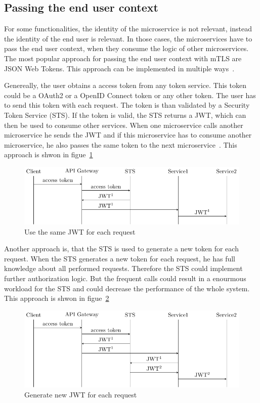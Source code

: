 \subsection{Passing the end user context}
For some functionalities, the identity of the microservice is not relevant, instead the identity of the end user is relevant.
In those cases, the microservices have to pass the end user context, when they consume the logic of other microservices.
The most popular approach for passing the end user context with mTLS are JSON Web Tokens.
This approach can be implemented in multiple ways~\cite{dias2020microservices}.

Genereally, the user obtains a access token from any token service.
This token could be a OAuth2 or a OpenID Connect token or any other token.
The user has to send this token with each request.
The token is than validated by a Security Token Service (STS).
If the token is valid, the STS returns a JWT, which can then be used to consume other services.
When one microservice calls another microservice he sends the JWT and if this microservice has to consume another microservice, he also passes the same token to the next microservice~\cite{dias2020microservices}.
This approach is shwon in figue~\ref{fig:mtls_id_1}
\begin{figure}
    \centering
	\includegraphics{images/authentication-mechanisms/TikZ_jwt_identity_1.pdf}
    \caption{Use the same JWT for each request~\cite{dias2020microservices}}
	\label{fig:mtls_id_1}
\end{figure}

Another approach is, that the STS is used to generate a new token for each request.
When the STS generates a new token for each request, he has full knowledge about all performed requests.
Therefore the STS could implement further authorization logic.
But the frequent calls could result in a enourmous workload for the STS and could decrease the performance of the whole system.
This approach is shwon in figue~\ref{fig:mtls_id_2}

\begin{figure}[H]
	\centering
	\includegraphics{images/authentication-mechanisms/TikZ_jwt_identity_2.pdf}
	\caption{Generate new JWT for each request~\cite{dias2020microservices}}
	\label{fig:mtls_id_2}
\end{figure}

